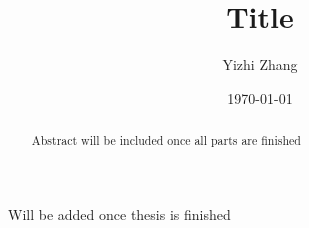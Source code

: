 \documentclass{iitthesis}
\theoremstyle{definition}
\theoremstyle{remark}
\begin{document}
\title{Title}
\author{Yizhi Zhang}
\date{\today}
\copyrightnoticefalse      %
\maketitle                %


\prelimpages         %


\begin{acknowledgement}     %
\par  Will be added once thesis is finished
\end{acknowledgement}


\tableofcontents
\clearpage

\listoftables

\clearpage

\listoffigures

\clearpage


\listofsymbols

 \clearpage



\begin{abstract}           %
\par Abstract will be included once all parts are finished
\end{abstract}


\textpages     %

\end{document}
